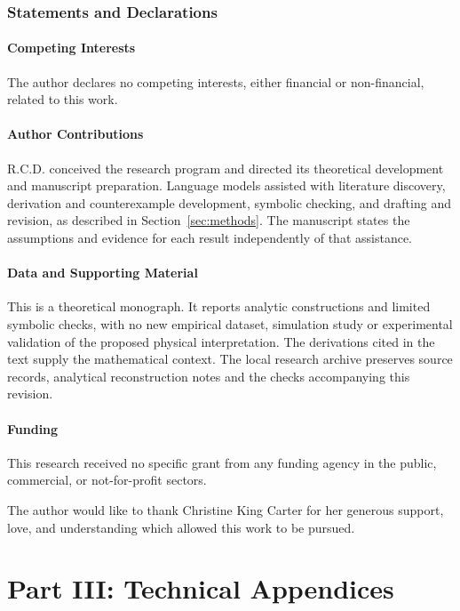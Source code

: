\section{Statements and Declarations}\label{sec:statements}

\subsection*{Competing Interests}
The author declares no competing interests, either financial or non-financial, related to this work.

\subsection*{Author Contributions}
R.C.D. conceived the research program and directed its theoretical development and manuscript preparation. Language models assisted with literature discovery, derivation and counterexample development, symbolic checking, and drafting and revision, as described in Section~\ref{sec:methods}. The manuscript states the assumptions and evidence for each result independently of that assistance.

\subsection*{Data and Supporting Material}
This is a theoretical monograph. It reports analytic constructions and limited symbolic checks, with no new empirical dataset, simulation study or experimental validation of the proposed physical interpretation. The derivations cited in the text supply the mathematical context. The local research archive preserves source records, analytical reconstruction notes and the checks accompanying this revision.

\subsection*{Funding}
This research received no specific grant from any funding agency in the public, commercial, or not-for-profit sectors.

\begin{acknowledgments}
The author would like to thank Christine King Carter for her generous support, love, and understanding which allowed this work to be pursued.
\end{acknowledgments}

\clearpage
\part*{Part III: Technical Appendices}
\appendix
